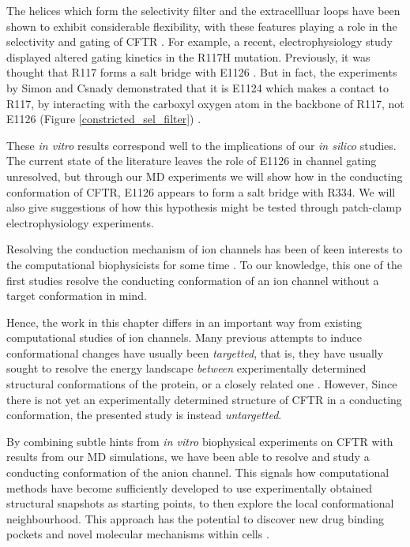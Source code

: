 The helices which form the selectivity filter and the extracellluar loops have been shown to exhibit considerable flexibility, with these features playing a role in the selectivity and gating of CFTR \cite{simon2021}. For example, a recent, electrophysiology study displayed altered gating kinetics in the R117H mutation.  Previously, it was thought that R117 forms a salt bridge with E1126 \cite{cui2014}. But in fact, the experiments by Simon and Csnady demonstrated that it is E1124 which makes a contact to R117, by interacting with the carboxyl oxygen atom in the backbone of R117, not E1126 (Figure \ref{constricted_sel_filter}) \cite{simon2021}. 

These \textit{in vitro} results correspond well to the implications of our \textit{in silico} studies. The current state of the literature leaves the role of E1126 in channel gating unresolved, but through our MD experiments we will show how in the conducting conformation of CFTR, E1126 appears to form a salt bridge with R334. We will also give suggestions of how this hypothesis might be tested through patch-clamp electrophysiology experiments. 

Resolving the conduction mechanism of ion channels has been of keen interests to the computational biophysicists for some time \cite{black2020, flood2019}. To our knowledge, this one of the first studies resolve the conducting conformation of an ion channel without a target conformation in mind. 

Hence, the work in this chapter differs in an important way from existing computational studies of ion channels. Many previous attempts to induce conformational changes have usually been \textit{targetted}, that is, they have usually sought to resolve the energy landscape \textit{between} experimentally determined structural conformations of the protein, or a closely related one \cite{hoffman2018, lev2020, bergh2021, mccomas2022}. However, Since there is not yet an experimentally determined structure of CFTR in a conducting conformation, the presented study is instead \textit{untargetted}. 

By combining subtle hints from \textit{in vitro} biophysical experiments on CFTR with results from our MD simulations, we have been able to resolve and study a conducting conformation of the anion channel. This signals how computational methods have become sufficiently developed to use experimentally obtained structural snapshots as starting points, to then explore the local conformational neighbourhood. This approach has the potential to discover new drug binding pockets and novel molecular mechanisms within cells \cite{}.

